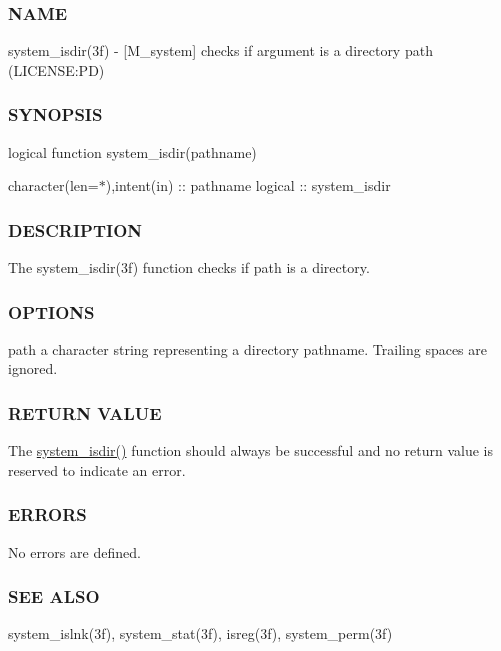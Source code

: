 \subsubsection*{N\+A\+ME}

system\+\_\+isdir(3f) -\/ \mbox{[}M\+\_\+system\mbox{]} checks if argument is a directory path (L\+I\+C\+E\+N\+SE\+:PD) 

\subsubsection*{S\+Y\+N\+O\+P\+S\+IS}

logical function system\+\_\+isdir(pathname)

character(len=$\ast$),intent(in) \+:\+: pathname logical \+:\+: system\+\_\+isdir

\subsubsection*{D\+E\+S\+C\+R\+I\+P\+T\+I\+ON}

The system\+\_\+isdir(3f) function checks if path is a directory.

\subsubsection*{O\+P\+T\+I\+O\+NS}

path a character string representing a directory pathname. Trailing spaces are ignored.

\subsubsection*{R\+E\+T\+U\+RN V\+A\+L\+UE}

The \mbox{\hyperlink{namespacem__system_ad097988a031e64b4f21f856cf45c9c73}{system\+\_\+isdir()}} function should always be successful and no return value is reserved to indicate an error.

\subsubsection*{E\+R\+R\+O\+RS}

No errors are defined.

\subsubsection*{S\+EE A\+L\+SO}

system\+\_\+islnk(3f), system\+\_\+stat(3f), isreg(3f), system\+\_\+perm(3f)

